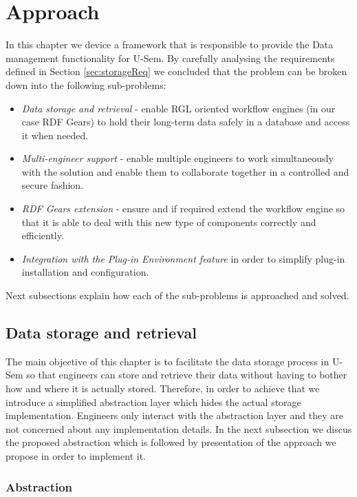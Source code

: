\section{Approach}
\label{sec:approachStorage}

In this chapter we device a framework that is responsible to provide the Data management functionality for U-Sem. By carefully analysing the requirements defined in Section \ref{sec:storageReq} we concluded that the problem can be broken down into the following sub-problems:
\begin{itemize}
	\item \textit{Data storage and retrieval} - enable RGL oriented workflow engines (in our case RDF Gears) to hold their long-term data safely in a database and access it when needed.
	\item \textit{Multi-engineer support} - enable multiple engineers to work simultaneously with the solution and enable them to collaborate together in a controlled and secure fashion.
	\item \textit{RDF Gears extension} - ensure and if required extend the workflow engine so that it is able to deal with this new type of components correctly and efficiently.
	\item \textit{Integration with the Plug-in Environment feature} in order to simplify plug-in installation and configuration.
\end{itemize}

Next subsections explain how each of the sub-problems is approached and solved.

\subsection{Data storage and retrieval}

The main objective of this chapter is to facilitate the data storage process in U-Sem so that engineers can store and retrieve their data without having to bother how and where it is actually stored. Therefore, in order to achieve that we introduce a simplified abstraction layer which hides the actual storage implementation. Engineers only interact with the abstraction layer and they are not concerned about any implementation details. In the next subsection we discus the proposed abstraction which is followed by presentation of the approach we propose in order to implement it.

\subsubsection{Abstraction}

